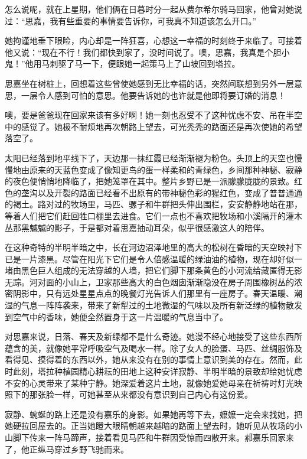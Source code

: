 \par 怎么说呢，就在上星期，他们俩在日暮时分一起从费尔希尔骑马回家，他曾对她说过：“思嘉，我有些重要的事情要告诉你，可我真不知道该怎么开口。”
\par 她拘谨地垂下眼睑，内心却是一阵狂喜，心想这一幸福的时刻终于来临了。可接着他又说：“现在不行！我们都快到家了，没时间说了。噢，思嘉，我真是个胆小鬼！”他用马刺驱了马一下，便跟她一起策马上了山坡回到塔拉。
\par 思嘉坐在树桩上，回想着这些曾使她感到无比幸福的话，突然间联想到另外一层意思，一层令人感到可怕的意思。他要告诉她的也许就是他即将要订婚的消息！
\par 噢，要是爸爸现在回家来该有多好啊！她一刻也忍受不了这种忧虑不安、吊在半空中的感觉了。她极不耐烦地再次朝路上望去，可光秃秃的路面还是再次使她的希望落空了。
\par 太阳已经落到地平线下了，天边那一抹红霞已经渐渐褪为粉色。头顶上的天空也慢慢地由原来的天蓝色变成了像知更鸟的蛋一样柔和的青绿色，乡间那种神秘、寂静的夜色便悄悄地降临了，把她笼罩在其中。整片乡野已是一派朦朦胧胧的景致。红色的垄沟以及开裂的路面已经看不出原有的带神秘色彩的猩红色，变成了普普通通的褐土。路对过的牧场里，马匹、骡子和牛群把头伸出围栏，安安静静地站在那，等着人们把它们赶回牲口棚里去进食。它们一点也不喜欢把牧场和小溪隔开的灌木丛那黑魆魆的影子，于是都对着思嘉抽动耳朵，似乎很感激这人的陪伴。
\par 在这种奇特的半明半暗之中，长在河边沼泽地里的高大的松树在昏暗的天空映衬下已是一片漆黑。尽管在阳光下它们是令人倍感温暖的绿油油的植物，现在却好似一堵由黑色巨人组成的无法穿越的人墙，把它们脚下那条黄色的小河流给藏匿得无影无踪。河对面的小山上，卫家那些高大的白色烟囱渐渐隐没在房子周围橡树丛的浓密阴影中，只有远处星星点点的晚餐灯光告诉人们那里有一座房子。春天温暖、潮湿的气息一阵阵袭来，带来了新犁过的土地微湿的气味以及所有新泛绿的植物散发到空气中的香味，她便全然置身于这一片温暖的气息当中了。
\par 对思嘉来说，日落、春天及新绿都不是什么奇迹。她漫不经心地接受了这些东西所蕴含的美，就像她平常呼吸空气及喝水一样。除了女人的脸蛋、马匹、丝绸服饰及看得见、摸得着的东西以外，她从来没有在别的事情上意识到美的存在。然而，此时此刻，塔拉种植园精心耕耘的田地上这种安详寂静、半明半暗的景致却给她忧虑不安的心灵带来了某种宁静。她深爱着这片土地，就像她爱她母亲在祈祷时灯光映照下的那张脸一样，可她甚至从来都没有意识到自己内心有这份爱。
\par 寂静、蜿蜒的路上还是没有嘉乐的身影。如果她再等下去，嬷嬷一定会来找她，把她硬拉回屋去的。正当她瞪大眼睛朝越来越暗的路面上望去时，她听见从牧场的小山脚下传来一阵马蹄声，接着看见马匹和牛群因受惊而四散开来。郝嘉乐回家来了，他正纵马穿过乡野飞驰而来。

